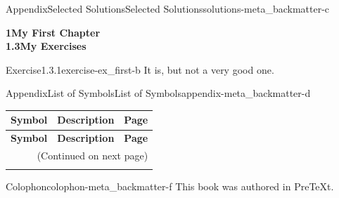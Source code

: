 \documentclass[oneside,10pt,]{book}
\newcommand{\xreffont}{\relax}
\providecommand\phantomsection{}
\begin{document}
%
%
\typeout{************************************************}
\typeout{************************************************}
%
\begin{solutions-chapter}{Appendix}{Selected Solutions}{}{Selected Solutions}{}{}{solutions-meta_backmatter-c}
\par\medskip
\noindent\textbf{\Large{}1\space\textperiodcentered\space{}My First Chapter\\
1.3\space\textperiodcentered\space{}My Exercises}
\begin{divisionsolution}{Exercise}{1.3.1}{}{exercise-ex_first-b}%
\noindent\hypertarget{solution-ex_first-b-c-back}{}It is, but not a very good one.%
\end{divisionsolution}%
\end{solutions-chapter}
%
%
\typeout{************************************************}
\typeout{************************************************}
%
\begin{appendixptx}{Appendix}{List of Symbols}{}{List of Symbols}{}{}{appendix-meta_backmatter-d}
\renewcommand*{\appendixname}{Appendix}
\begin{longtable}[l]{lp{}r}
\addtocounter{table}{-1}
\textbf{Symbol}&\textbf{Description}&\textbf{Page}\\[1em]
\endfirsthead
\textbf{Symbol}&\textbf{Description}&\textbf{Page}\\[1em]
\endhead
\multicolumn{3}{r}{(Continued on next page)}\\
\endfoot
\endlastfoot
\end{longtable}
\end{appendixptx}
%
\backmatter%
%
\clearpage\phantomsection%
%
%
{\xreffont\printindex}
%
\clearpage
\pagestyle{empty}
\begin{backcolophon}{Colophon}{colophon-meta_backmatter-f}%
This book was authored in PreTeXt.%
\end{backcolophon}%
\end{document}
